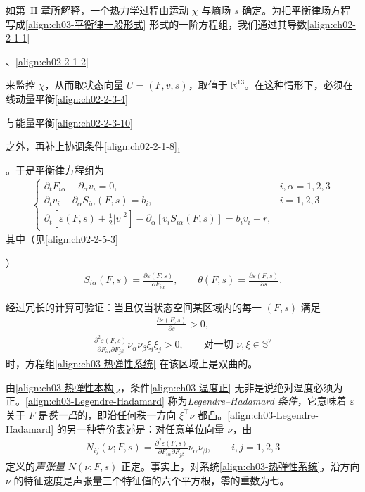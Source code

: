 ﻿\documentclass[../../main.tex]{subfiles}
\begin{document}
如第~II 章所解释，一个热力学过程由运动 $\chi$ 与熵场 $s$ 确定。为把平衡律场方程写成\eqref{align:ch03-平衡律一般形式} 形式的一阶方程组，我们通过其导数\eqref{align:ch02-2-1-1}%

、\eqref{align:ch02-2-1-2}%

来监控 $\chi$，从而取状态向量 $U=(F,v,s)$，取值于 $\mathbb{R}^{13}$。在这种情形下，必须在线动量平衡\eqref{align:ch02-2-3-4}%

与能量平衡\eqref{align:ch02-2-3-10}%

之外，再补上协调条件\eqref{align:ch02-2-1-8}$_{1}$%

。于是平衡律方程组为
\begin{align}
\begin{cases}
\partial_{t}F_{i\alpha}-\partial_{\alpha}v_{i}=0, & i,\alpha=1,2,3\\
\partial_{t}v_{i}-\partial_{\alpha}S_{i\alpha}(F,s)=b_{i}, & i=1,2,3\\
\partial_{t}\left[\varepsilon(F,s)+\frac{1}{2}|v|^{2}\right]-\partial_{\alpha}\left[v_{i}S_{i\alpha}(F,s)\right]=b_{i}v_{i}+r, &
\end{cases}
\label{align:ch03-热弹性系统}
\end{align}
其中（见\eqref{align:ch02-2-5-3}%

）
\begin{align}
S_{i\alpha}(F,s)=\frac{\partial\varepsilon(F,s)}{\partial F_{i\alpha}},\qquad \theta(F,s)=\frac{\partial\varepsilon(F,s)}{\partial s}.
\label{align:ch03-热弹性本构}
\end{align}

经过冗长的计算可验证：当且仅当状态空间某区域内的每一 $(F,s)$ 满足
\begin{align}
\frac{\partial\varepsilon(F,s)}{\partial s}>0,
\label{align:ch03-温度正}
\end{align}
\begin{align}
\frac{\partial^{2}\varepsilon(F,s)}{\partial F_{i\alpha}\partial F_{j\beta}}\nu_{\alpha}\nu_{\beta}\xi_{i}\xi_{j}>0,\qquad \text{对一切 }\nu,\xi\in\mathbb{S}^{2}
\label{align:ch03-Legendre-Hadamard}
\end{align}
时，方程组\eqref{align:ch03-热弹性系统} 在该区域上是双曲的。

由\eqref{align:ch03-热弹性本构}$_{2}$，条件\eqref{align:ch03-温度正} 无非是说绝对温度必须为正。\eqref{align:ch03-Legendre-Hadamard} 称为\emph{Legendre--Hadamard 条件}，它意味着 $\varepsilon$ 关于 $F$ 是\emph{秩一凸}的，即沿任何秩一方向 $\xi^{\top}\nu$ 都凸。\eqref{align:ch03-Legendre-Hadamard} 的另一种等价表述是：对任意单位向量 $\nu$，由
\begin{align}
N_{ij}(\nu;F,s)=\frac{\partial^{2}\varepsilon(F,s)}{\partial F_{i\alpha}\partial F_{j\beta}}\nu_{\alpha}\nu_{\beta},\qquad i,j=1,2,3
\label{align:ch03-声张量}
\end{align}
定义的\emph{声张量} $N(\nu;F,s)$ 正定。事实上，对系统\eqref{align:ch03-热弹性系统}，沿方向 $\nu$ 的特征速度是声张量三个特征值的六个平方根，零的重数为七。
\end{document}
